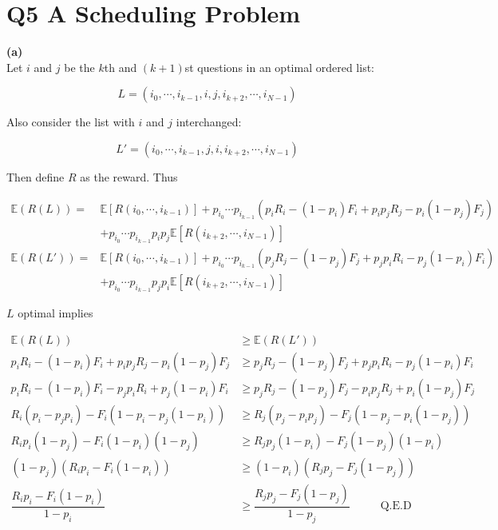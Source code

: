 \documentclass[11pt, english]{article}
\begin{document}
\section*{Q5 A Scheduling Problem}

\textbf{(a)}\\

Let $i$ and $j$ be the $k$th and $(k + 1)$st questions
in an optimal ordered list:

\begin{equation*}
L = (i_0, \cdots , i_{k-1}, i, j, i_{k+2}, \cdots, i_{N-1})
\end{equation*}

Also consider the list with $i$ and $j$ interchanged:

\begin{equation*}
L' = (i_0, \cdots , i_{k-1}, j, i, i_{k+2}, \cdots, i_{N-1})
\end{equation*}

Then define $R$ as the reward. Thus

\begin{align*}
\mathbb{E}(R(L)) =& \mathbb{E} \left[R(i_0, \cdots, i_{k-1})\right] + p_{i_0} \cdots p_{i_{k-1}} \left(p_i R_i - (1-p_i)F_i + p_ip_jR_j - p_i(1-p_j)F_j\right)\\
&+ p_{i_0} \cdots p_{i_{k-1}} p_i p_j \mathbb{E} \left[R(i_{k+2}, \cdots, i_{N-1})\right] \\
\mathbb{E}(R(L')) =& \mathbb{E} \left[R(i_0, \cdots, i_{k-1})\right] + p_{i_0} \cdots p_{i_{k-1}} \left(p_j R_j - (1-p_j)F_j + p_jp_iR_i - p_j(1-p_i)F_i\right)\\
&+ p_{i_0} \cdots p_{i_{k-1}} p_j p_i \mathbb{E} \left[R(i_{k+2}, \cdots, i_{N-1})\right]
\end{align*}

$L$ optimal implies

\begin{align*}
\mathbb{E}(R(L)) &\geq \mathbb{E}(R(L'))\\
p_i R_i - (1-p_i)F_i + p_ip_jR_j - p_i(1-p_j)F_j &\geq p_j R_j - (1-p_j)F_j + p_jp_iR_i - p_j(1-p_i)F_i \\
p_i R_i - (1-p_i)F_i - p_jp_iR_i + p_j(1-p_i)F_i &\geq p_j R_j - (1-p_j)F_j - p_ip_jR_j + p_i(1-p_j)F_j\\
R_i (p_i - p_jp_i) - F_i(1-p_i -p_j(1-p_i)) &\geq R_j(p_j - p_ip_j) - F_j(1-p_j-p_i(1-p_j)) \\
R_i p_i(1-p_j) - F_i(1-p_i)(1-p_j) &\geq R_jp_j(1-p_i) - F_j(1-p_j)(1-p_i) \\
(1-p_j)(R_ip_i - F_i(1-p_i)) &\geq (1-p_i)(R_jp_j - F_j(1-p_j)) \\
\dfrac{R_ip_i - F_i(1-p_i)}{1-p_i} &\geq \dfrac{R_jp_j - F_j(1-p_j)}{1-p_j} \hspace{1cm}\text{ Q.E.D}
\end{align*}
\end{document}
